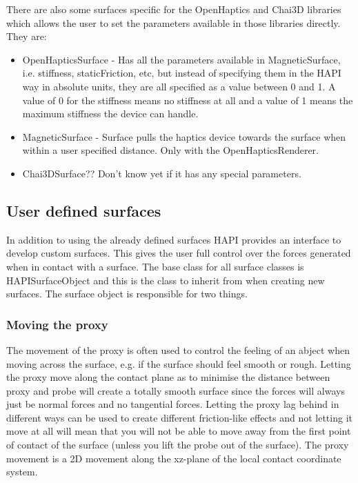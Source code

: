 There are also some surfaces specific for the OpenHaptics and Chai3D
libraries which allows the user to set the parameters available in
those libraries directly. They are:
\begin{itemize}
\item OpenHapticsSurface - Has all the parameters available in
  MagneticSurface, i.e. stiffness, staticFriction, etc, but instead of
  specifying them in the HAPI way in absolute units, they are all
  specified as a value between 0 and 1. A value of 0 for the stiffness
  means no stiffness at all and a value of 1 means the maximum
  stiffness the device can handle.
\item MagneticSurface - Surface pulls the haptics device towards the
  surface when within a user specified distance. Only with the OpenHapticsRenderer.
\item Chai3DSurface?? Don't know yet if it has any special parameters.
\end{itemize}

\subsection{User defined surfaces}
In addition to using the already defined surfaces HAPI provides an interface to develop custom surfaces. This gives the user full control over the forces generated when in contact with a surface. The base class for all surface classes is HAPISurfaceObject and this is the class to inherit from when creating new surfaces. The surface object is responsible for two things. 


\subsubsection{Moving the proxy}
The movement of the proxy is often used to control the feeling of an abject when moving across the surface, e.g. if the surface should feel smooth or rough. Letting the proxy move along the contact plane as to minimise the distance between proxy and probe will create a totally smooth surface since the forces will always just be normal forces and no tangential forces. Letting the proxy lag behind in different ways can be used to create different friction-like effects and not letting it move at all will mean that you will not be able to move away from the first point of contact of the surface (unless you lift the probe out of the surface). The proxy movement is a 2D movement along the xz-plane of the local contact coordinate system. 


